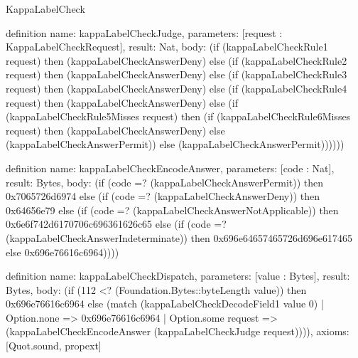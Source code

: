 \begin{lexlean}{KappaLabelCheck}
\begin{semanticmodule}
definition{
  name: kappaLabelCheckJudge,
  parameters: [request : KappaLabelCheckRequest],
  result: Nat,
  body: (if (kappaLabelCheckRule1 request) then (kappaLabelCheckAnswerDeny) else (if (kappaLabelCheckRule2 request) then (kappaLabelCheckAnswerDeny) else (if (kappaLabelCheckRule3 request) then (kappaLabelCheckAnswerDeny) else (if (kappaLabelCheckRule4 request) then (kappaLabelCheckAnswerDeny) else (if (kappaLabelCheckRule5Misses request) then (if (kappaLabelCheckRule6Misses request) then (kappaLabelCheckAnswerDeny) else (kappaLabelCheckAnswerPermit)) else (kappaLabelCheckAnswerPermit))))))
}

definition{
  name: kappaLabelCheckEncodeAnswer,
  parameters: [code : Nat],
  result: Bytes,
  body: (if (code =? (kappaLabelCheckAnswerPermit)) then 0x7065726d6974 else (if (code =? (kappaLabelCheckAnswerDeny)) then 0x64656e79 else (if (code =? (kappaLabelCheckAnswerNotApplicable)) then 0x6e6f742d6170706c696361626c65 else (if (code =? (kappaLabelCheckAnswerIndeterminate)) then 0x696e64657465726d696e617465 else 0x696e76616c6964))))
}

definition{
  name: kappaLabelCheckDispatch,
  parameters: [value : Bytes],
  result: Bytes,
  body: (if (112 <? (Foundation.Bytes::byteLength value)) then 0x696e76616c6964 else (match (kappaLabelCheckDecodeField1 value 0)
    | Option.none => 0x696e76616c6964
    | Option.some request => (kappaLabelCheckEncodeAnswer (kappaLabelCheckJudge request)))),
  axioms: [Quot.sound, propext]
}
\end{semanticmodule}
\end{lexlean}
